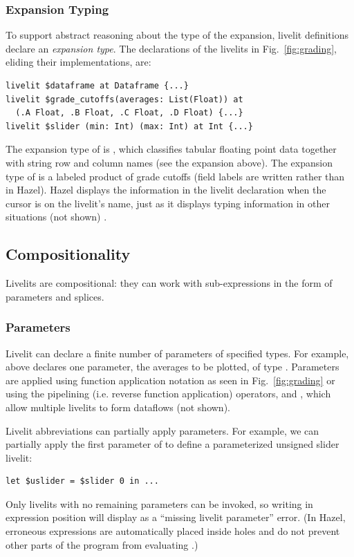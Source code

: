 \subsubsection{Expansion Typing}
\label{sec:expansion-typing}
To support abstract reasoning about the type of the expansion,
livelit definitions declare an \emph{expansion type}.
The declarations of the livelits in Fig.~\ref{fig:grading},
eliding their implementations, are:
\begin{lstlisting}[numbers=none,xleftmargin=0cm]
livelit $dataframe at Dataframe {...}
livelit $grade_cutoffs(averages: List(Float)) at
  (.A Float, .B Float, .C Float, .D Float) {...}
livelit $slider (min: Int) (max: Int) at Int {...}
\end{lstlisting}
The expansion type of  is ,
which classifies tabular floating point data together with string row and column names (see the expansion above).
The expansion type of  is a labeled product of grade cutoffs (field labels are written 
rather than  in Hazel).
Hazel displays the information in the livelit declaration when the cursor is on the livelit's name,
just as it displays typing information in other situations (not shown) \cite{hazeltutor}.

\subsection{Compositionality}\label{sec:splicing-and-parameterization}
Livelits are compositional: they can work with sub-expressions
in the form of parameters and splices.

\subsubsection{Parameters}\label{sec:parameterization}
Livelit can declare a finite number of parameters of specified types.
For example,  above declares one parameter,
the averages to be plotted, of type .
Parameters are applied
using function application notation
as seen in Fig.~\ref{fig:grading} or
using the pipelining (i.e. reverse function application) operators, \li{<|} and \li{|>},
which allow multiple livelits to form dataflows (not shown).

Livelit abbreviations can partially apply parameters. For example,
we can partially apply the first parameter of  to define a parameterized unsigned slider livelit:
\begin{lstlisting}[numbers=none,xleftmargin=0cm]
let $uslider = $slider 0 in ...
\end{lstlisting}
Only livelits with no remaining parameters can be invoked,
so writing  in expression position will display as a ``missing livelit parameter'' error.
(In Hazel, erroneous expressions
are automatically placed inside holes and do not prevent other parts of the program from evaluating
\cite{HazelnutLive}.)


